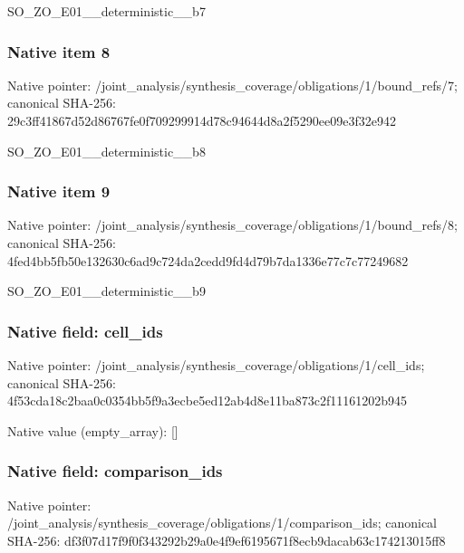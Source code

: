 \documentclass[10pt,a4paper]{article}
\begin{document}
\begingroup\raggedright\sloppy SO\_\allowbreak{}ZO\_\allowbreak{}E01\_\allowbreak{}\_\allowbreak{}deterministic\_\allowbreak{}\_\allowbreak{}b7\par\endgroup

\subsubsection{Native item 8}
Native pointer: /joint\_\allowbreak{}analysis/synthesis\_\allowbreak{}coverage/obligations/1/bound\_\allowbreak{}refs/7; canonical SHA-256: 29c3ff41867d52d86767fe0f709299914d78c94644d8a2f5290ee09e3f32e942

\begingroup\raggedright\sloppy SO\_\allowbreak{}ZO\_\allowbreak{}E01\_\allowbreak{}\_\allowbreak{}deterministic\_\allowbreak{}\_\allowbreak{}b8\par\endgroup

\subsubsection{Native item 9}
Native pointer: /joint\_\allowbreak{}analysis/synthesis\_\allowbreak{}coverage/obligations/1/bound\_\allowbreak{}refs/8; canonical SHA-256: 4fed4bb5fb50e132630c6ad9c724da2cedd9fd4d79b7da1336e77c7c77249682

\begingroup\raggedright\sloppy SO\_\allowbreak{}ZO\_\allowbreak{}E01\_\allowbreak{}\_\allowbreak{}deterministic\_\allowbreak{}\_\allowbreak{}b9\par\endgroup

\subsubsection{Native field: cell\_\allowbreak{}ids}
Native pointer: /joint\_\allowbreak{}analysis/synthesis\_\allowbreak{}coverage/obligations/1/cell\_\allowbreak{}ids; canonical SHA-256: 4f53cda18c2baa0c0354bb5f9a3ecbe5ed12ab4d8e11ba873c2f11161202b945

Native value (empty\_\allowbreak{}array): []

\subsubsection{Native field: comparison\_\allowbreak{}ids}
Native pointer: /joint\_\allowbreak{}analysis/synthesis\_\allowbreak{}coverage/obligations/1/comparison\_\allowbreak{}ids; canonical SHA-256: df3f07d17f9f0f343292b29a0e4f9ef6195671f8ecb9dacab63c174213015ff8
\end{document}
